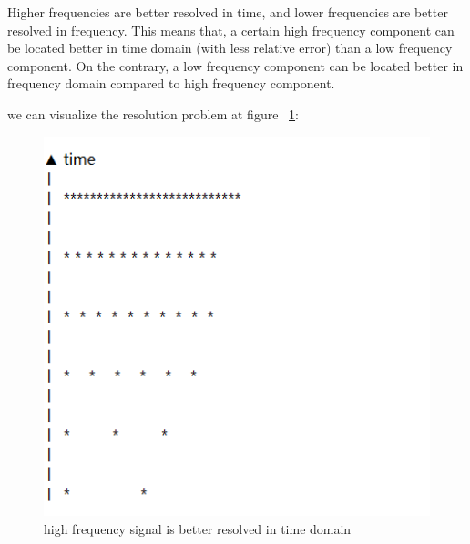 Higher frequencies are better resolved in time, and lower frequencies are better resolved in frequency. This means that, a certain high frequency component can be located better in time domain (with less relative error) than a low frequency component. On the contrary, a low frequency component can be located better in frequency domain compared to high frequency component.

we can visualize the resolution problem at figure ~\ref{fig:resolution}:

\begin{figure}[h]
\centering
\includegraphics[width=1\textwidth]{images/resolution_blank1.PNG}
\caption{high frequency signal is better resolved in time domain}
\label{fig:resolution}
\end{figure}



